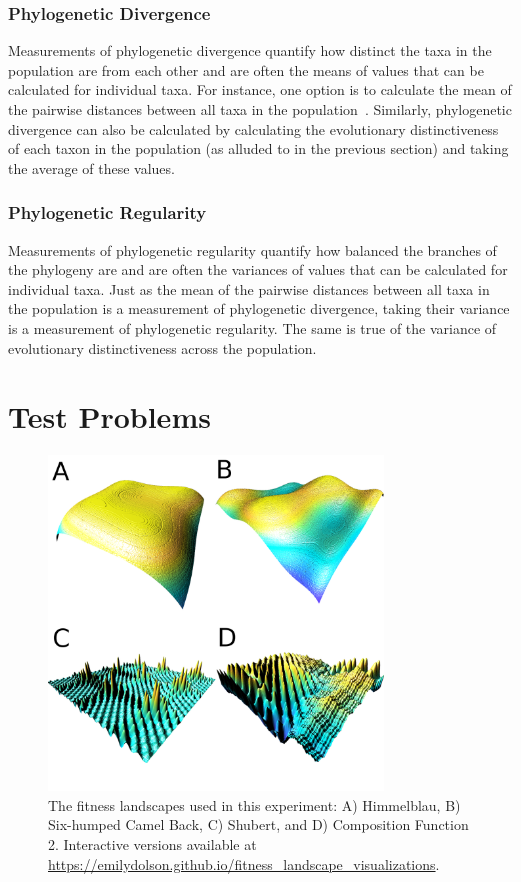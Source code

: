 \documentclass[letterpaper]{article}
\begin{document}
\subsubsection{Phylogenetic Divergence}

Measurements of phylogenetic divergence quantify how distinct the taxa in the population are from each other and are often the means of values that can be calculated for individual taxa. For instance, one option is to calculate the mean of the pairwise distances between all taxa in the population~\citep{webb_exploring_2000}. Similarly, phylogenetic divergence can also be calculated by calculating the evolutionary distinctiveness of each taxon in the population (as alluded to in the previous section) and taking the average of these values.

\subsubsection{Phylogenetic Regularity}

Measurements of phylogenetic regularity quantify how balanced the branches of the phylogeny are and are often the variances of values that can be calculated for individual taxa. Just as the mean of the pairwise distances between all taxa in the population is a measurement of phylogenetic divergence, taking their variance is a measurement of phylogenetic regularity. The same is true of the variance of evolutionary distinctiveness across the population.

\section{Test Problems}
\begin{figure}
\includegraphics[width=3.5in]{figs/landscapes.png}
\caption{The fitness landscapes used in this experiment: A) Himmelblau, B) Six-humped Camel Back, C) Shubert, and D) Composition Function 2. Interactive versions available at \url{https://emilydolson.github.io/fitness_landscape_visualizations}.}
\label{fig:landscapes}
\end{figure}
\end{document}
